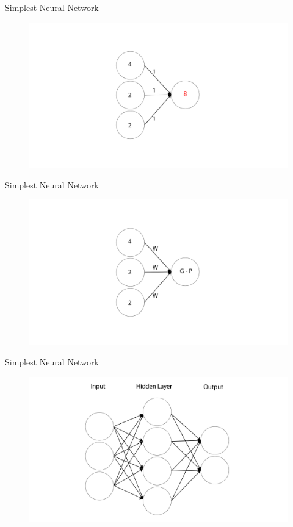 \documentclass[10pt]{beamer}
\begin{document}
\begin{frame}{Simplest Neural Network}
		\begin{figure}	
			\includegraphics[width=1.5\textwidth, center, trim=0cm 0cm 0 0cm]{images/No_hidden_8W_NN.pdf}
	\end{figure}
\end{frame}

\begin{frame}{Simplest Neural Network}
		\begin{figure}	
			\includegraphics[width=1.5\textwidth, center, trim=0cm 0cm 0 0cm]{images/No_hidden_gen_NN.pdf}
	\end{figure}
\end{frame}

\begin{frame}{Simplest Neural Network}
		\begin{figure}	
			\includegraphics[width=1.0\textwidth, center, trim=0cm 0cm 0 0cm]{images/Dense_NN.pdf}
	\end{figure}
\end{frame}
\end{document}
